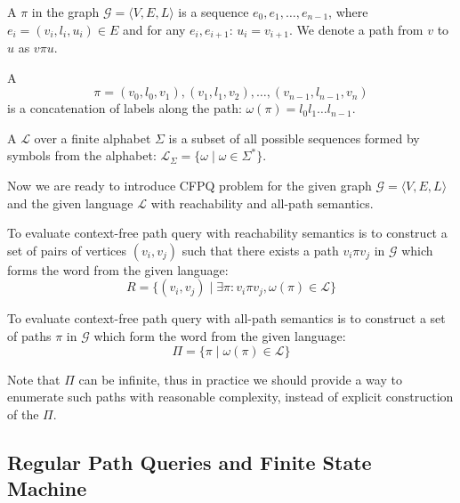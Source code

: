 \begin{definition}
A  $\pi$ in the graph $\mathcal{G} = \langle V,E,L \rangle$ is a sequence $e_0,e_1,\ldots,e_{n-1}$, where $e_i = (v_i,l_i,u_i) \in E$ and for any $e_i, e_{i+1}$: $u_i = v_{i+1}$. We denote a path from $v$ to $u$ as $v\pi u$.
\end{definition}

\begin{definition}
A  $$\pi = (v_0,l_0,v_1),(v_1,l_1,v_2),\ldots,(v_{n-1},l_{n-1},v_n)$$ is a concatenation of labels along the path: $\omega(\pi) = l_0 l_1 \ldots l_{n-1}$.
\end{definition}


\begin{definition}
A  $\mathcal{L}$ over a finite alphabet $\Sigma$ is a subset of all possible sequences formed by symbols from the alphabet: $\mathcal{L}_{\Sigma} = \{\omega \mid \omega \in \Sigma^*\}$.
\end{definition}

Now we are ready to introduce CFPQ problem for the given graph  $\mathcal{G} = \langle V,E,L \rangle$ and the given language $\mathcal{L}$ with reachability and all-path semantics.

\begin{definition}
To evaluate context-free path query with reachability semantics is to construct a set of pairs of vertices $(v_i,v_j)$ such that there exists a path $v_i \pi v_j$ in $\mathcal{G}$ which forms the word from the given language:
$$
R = \{(v_i,v_j) \mid \exists \pi: v_i \pi v_j, \omega(\pi) \in \mathcal{L} \}
$$
\end{definition}

\begin{definition}
To evaluate context-free path query with all-path semantics is to construct a set of paths $\pi$ in $\mathcal{G}$ which form the word from the given language:
$$
\Pi = \{ \pi \mid \omega(\pi) \in \mathcal{L}\}
$$
\end{definition}

Note that $\Pi$ can be infinite, thus in practice we should provide a way to enumerate such paths with reasonable complexity, instead of explicit construction of the $\Pi$.

\subsection{Regular Path Queries and Finite State Machine}

